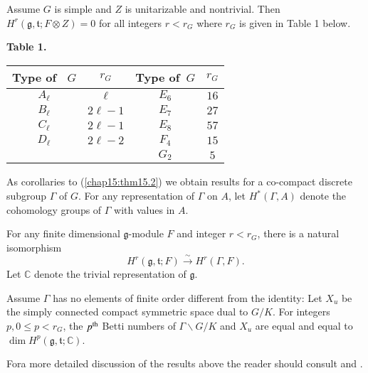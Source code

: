 \begin{theorem}\label{chap15:thm15.2}
Assume $G$ is simple and $Z$ is unitarizable and nontrivial. Then $H^r
(\mathfrak{g}, \mathfrak{t}; F \otimes Z) = 0$ for all integers $r <
r_G$ where $r_G$ is given in Table 1 below. 
\begin{center}
{\bf Table 1.}

\medskip

\renewcommand{\arraystretch}{1.2}
\tabcolsep=12pt
  \begin{tabular}{c|c||c|c}
    \hline
Type of \ $G$ & $r_G$ & Type of\ $G$ & $r_G$\\
    \hline
$A_{\ell}$ & $\ell$ & $E_6$ & $16$\\
$B_{\ell}$ & $2\ell-1$ & $E_7$ & $27$\\
$C_{\ell}$ & $2\ell-1$ & $E_8$ & $57$\\
$D_{\ell}$ & $2\ell-2$ & $F_4$ & $15$\\
& & $G_2$ & $5$\\
    \hline 
  \end{tabular}
\end{center}
\end{theorem}

As corollaries to (\ref{chap15:thm15.2}) we obtain results for a
co-compact discrete 
subgroup $\Gamma$ of $G$. For any representation of $\Gamma$ on $A$,
let $H^*(\Gamma, A)$ denote the cohomology groups of $\Gamma$ with
values in $A$. 

\begin{coro}\label{chap15:coro15.3}
For any finite dimensional $\mathfrak{g}$-module $F$ and integer
$r<r_G$, there is a natural isomorphism
$$
H^r(\mathfrak{g}, \mathfrak{t}; F) \xrightarrow{\sim} H^r (\Gamma,
F). 
$$
Let $\mathbb{C}$ denote the trivial representation of $\mathfrak{g}$. 
\end{coro}

\begin{coro}\label{chap15:coro15.4}
Assume $\Gamma$ has no elements of finite order different from the
identity: Let $X_u$ be the simply connected compact symmetric space
dual to $G/K$. For integers $p, 0\leq p < r_G$, the $p^{\rm th}$ Betti
numbers of $\Gamma \backslash G/K$ and $X_u$ are equal and equal to $\dim H^p
(\mathfrak{g}, \mathfrak{t}; \mathbb{C})$. 
\end{coro} 

For\pageoriginale a more detailed discussion of the results above the
reader should consult \cite{key18} and \cite{key4}. 

